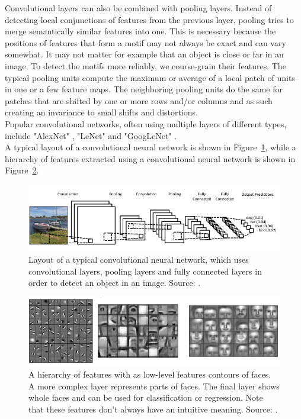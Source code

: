 Convolutional layers can also be combined with pooling layers. Instead of detecting local conjunctions of features from the previous layer, pooling tries to merge semantically similar features into one. This is necessary because the positions of features that form a motif may not always be exact and can vary somewhat. It may not matter for example that an object is close or far in an image.
To detect the motifs more reliably, we course-grain their features. The typical pooling units compute the maximum or average of a local patch of units in one or a few feature maps. The neighboring pooling units do the same for patches that are shifted by one or more rows and/or columns and as such creating an invariance to small shifts and distortions.\\
Popular convolutional networks, often using multiple layers of different types, include "AlexNet" \parencite{conf/nips/KrizhevskySH12}, "LeNet" \parencite{lecun-gradientbased-learning-applied-1998} and "GoogLeNet" \parencite{DBLP:journals/corr/SzegedyLJSRAEVR14}.\\
A typical layout of a convolutional neural network is shown in Figure~\ref{fig:cnnlayout}, while a hierarchy of features extracted using a convolutional neural network is shown in Figure~\ref{fig:cnnfeatures}.\\
\begin{figure}[htb]
    \centering
    \includegraphics[width=\linewidth]{images/cnnlayout.png}
    \caption[Convolutional neural network layout]{Layout of a typical convolutional neural network, which uses convolutional layers, pooling layers and fully connected layers in order to detect an object in an image. Source: \cite{clarifai}.}
    \label{fig:cnnlayout}
\end{figure}
\begin{figure}[htb]
    \centering
    \includegraphics[width=\linewidth]{images/cnnfeatures.png}
    \caption[Convolutional neural network features hierarchy]{A hierarchy of features with as low-level features contours of faces. A more complex layer represents parts of faces. The final layer shows whole faces and can be used for classification or regression. Note that these features don't always have an intuitive meaning. Source: \cite{conf/icml/LeeGRN09}.}
    \label{fig:cnnfeatures}
\end{figure}

